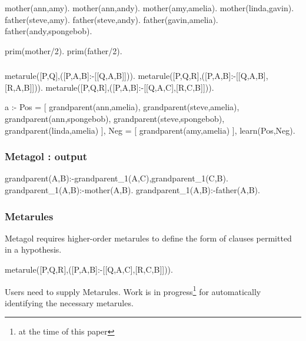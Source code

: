 \documentclass[11pt,handout]{beamer}
\begin{document}
\begin{frame}[fragile]
  \frametitle{}
  \begin{prologcode}
    mother(ann,amy).
    mother(ann,andy).
    mother(amy,amelia).
    mother(linda,gavin).
    father(steve,amy).
    father(steve,andy).
    father(gavin,amelia).
    father(andy,spongebob).

    prim(mother/2).
    prim(father/2).
  \end{prologcode}
\end{frame}

\begin{frame}[fragile]
  \frametitle{}
  \begin{prologcode}
    metarule([P,Q],([P,A,B]:-[[Q,A,B]])).
    metarule([P,Q,R],([P,A,B]:-[[Q,A,B],[R,A,B]])).
    metarule([P,Q,R],([P,A,B]:-[[Q,A,C],[R,C,B]])).

    a :-
      Pos = [
        grandparent(ann,amelia),
        grandparent(steve,amelia),
        grandparent(ann,spongebob),
        grandparent(steve,spongebob),
        grandparent(linda,amelia)
        ],
      Neg = [
        grandparent(amy,amelia)
      ],
      learn(Pos,Neg).
  \end{prologcode}
\end{frame}

\begin{frame}[fragile]
  \frametitle{Metagol : output}
  \begin{prologcode}
    grandparent(A,B):-grandparent_1(A,C),grandparent_1(C,B).
    grandparent_1(A,B):-mother(A,B).
    grandparent_1(A,B):-father(A,B).
  \end{prologcode}

\end{frame}

\begin{frame}[fragile]
  \frametitle{Metarules}
  Metagol requires higher-order metarules to define the form of clauses
  permitted in a hypothesis.
  \begin{prologcode}
    metarule([P,Q,R],([P,A,B]:-[[Q,A,C],[R,C,B]])).
  \end{prologcode}
  Users need to supply Metarules. Work is in progress\footnote{at the time of
    this paper} for automatically identifying the necessary metarules.
\end{frame}
\end{document}
